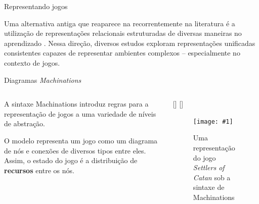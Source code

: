 \documentclass[aspectratio=169]{beamer}
\newcommand{\insertfigure}[3]{
  \StrBehind{#1}{/}[\FileWithExt]
  \StrBefore{\FileWithExt}{.}[\FileName]
  \begin{figure}[h!]
    \vspace{0.25cm}
    \centering
    \texttt{[image: \#1]}
    \caption{#2}
    \label{fig:\FileName}
  \end{figure}
}
\begin{document}
\begin{frame}{Representando jogos}
    \begin{outline}
        \1 Uma alternativa antiga que reaparece na recorrentemente na literatura é a utilização de representações relacionais estruturadas de diversas maneiras no aprendizado \parencite{rrl}.
        \1 Nessa direção, diversos estudos exploram representações unificadas consistentes capazes de representar ambientes complexos -- especialmente no contexto de jogos.
    \end{outline}
\end{frame}

\begin{frame}{Diagramas \textit{Machinations}}
        \begin{columns}
            \begin{column}{0.5\textwidth}
                \vspace{0.25cm}

                A sintaxe Machinations introduz regras para a representação de jogos a uma variedade de níveis de abstração.
                \vspace{0.25cm}

                O modelo representa um jogo como um diagrama de nós e conexões de diversos tipos entre eles. Assim, o estado do jogo é a distribuição de \textbf{recursos} entre os nós.
            \end{column}
            \begin{column}{0.5\textwidth}
                \insertfigure
                    {figures/catan.png}
                    {Uma representação do jogo \textit{Settlers of Catan} sob a sintaxe de Machinations \parencite{machinations}}
                    {0.8}
            \end{column}
        \end{columns}
    
\end{frame}
\end{document}
